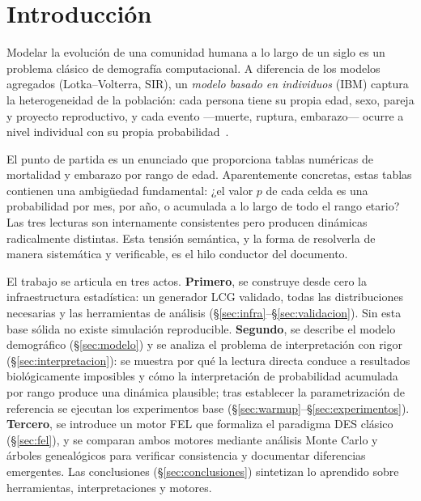 \documentclass{llncs}
\begin{document}
\section{Introducción}

Modelar la evolución de una comunidad humana a lo largo de un siglo es un
problema clásico de demografía computacional.
A diferencia de los modelos agregados (Lotka--Volterra, SIR), un
\emph{modelo basado en individuos} (IBM) captura la heterogeneidad de la
población: cada persona tiene su propia edad, sexo, pareja y proyecto
reproductivo, y cada evento ---muerte, ruptura, embarazo--- ocurre a nivel
individual con su propia probabilidad~\cite{axtell2000}.

El punto de partida es un enunciado que proporciona tablas numéricas de
mortalidad y embarazo por rango de edad.
Aparentemente concretas, estas tablas contienen una ambigüedad fundamental:
¿el valor $p$ de cada celda es una probabilidad por mes, por año, o
acumulada a lo largo de todo el rango etario?
Las tres lecturas son internamente consistentes pero producen dinámicas
radicalmente distintas.
Esta tensión semántica, y la forma de resolverla de manera sistemática y
verificable, es el hilo conductor del documento.

El trabajo se articula en tres actos.
\textbf{Primero}, se construye desde cero la infraestructura estadística:
un generador LCG validado, todas las distribuciones necesarias y las
herramientas de análisis (\S\ref{sec:infra}--\S\ref{sec:validacion}).
Sin esta base sólida no existe simulación reproducible.
\textbf{Segundo}, se describe el modelo demográfico (\S\ref{sec:modelo})
y se analiza el problema de interpretación con rigor (\S\ref{sec:interpretacion}):
se muestra por qué la lectura directa conduce a resultados biológicamente
imposibles y cómo la interpretación de probabilidad acumulada por rango
produce una dinámica plausible; tras establecer la parametrización de
referencia se ejecutan los experimentos base (\S\ref{sec:warmup}--\S\ref{sec:experimentos}).
\textbf{Tercero}, se introduce un motor FEL que formaliza el paradigma DES
clásico (\S\ref{sec:fel}), y se comparan ambos motores mediante análisis
Monte Carlo y árboles genealógicos para verificar consistencia y documentar
diferencias emergentes.
Las conclusiones (\S\ref{sec:conclusiones}) sintetizan lo aprendido sobre
herramientas, interpretaciones y motores.
\end{document}
